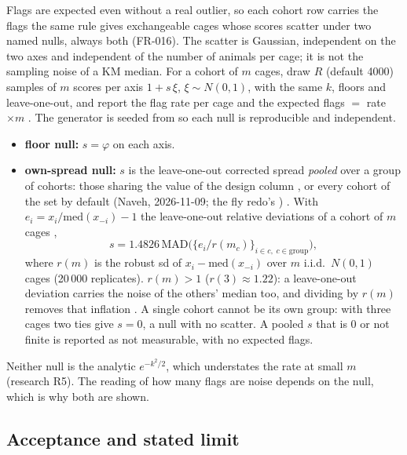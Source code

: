 Flags are expected even without a real outlier, so each cohort row carries the flags the same rule gives exchangeable
cages whose scores scatter under two named nulls, always both (FR-016). The scatter is Gaussian, independent on the two
axes and independent of the number of animals per cage; it is not the sampling noise of a KM median. For a cohort of $m$ cages, draw $R$ (default 4000) samples of $m$
scores per axis $1+s\,\xi$, $\xi\sim N(0,1)$, with the same $k$, floors and leave-one-out, and report the flag rate
per cage and the expected flags $=$ rate$\times m$ . The generator is
 seeded from  so each null is reproducible and independent.
\begin{itemize}[nosep]
  \item \textbf{floor null:} $s=\varphi$ on each axis.
  \item \textbf{own-spread null:} $s$ is the leave-one-out corrected spread \emph{pooled} over a group of cohorts:
    those sharing the value of the design column , or every cohort of the set by default (Naveh,
    2026-11-09; the fly redo's ) . With $e_i=x_i/\mathrm{med}(x_{-i})-1$ the leave-one-out
    relative deviations of a cohort of $m$ cages ,
    \begin{equation}\label{eq:clean-own}
      s=1.4826\,\mathrm{MAD}\big(\{e_i/r(m_c)\}_{i\in c,\;c\in\text{group}}\big),
    \end{equation}
    where $r(m)$ is the robust sd of $x_i-\mathrm{med}(x_{-i})$ over $m$ i.i.d.\ $N(0,1)$ cages (20\,000
    replicates). $r(m)>1$ ($r(3)\approx1.22$): a leave-one-out deviation carries the noise of the others' median too,
    and dividing by $r(m)$ removes that inflation . A single cohort cannot be its own
    group: with three cages two ties give $s=0$, a null with no scatter. A pooled $s$ that is $0$ or not finite is
    reported as not measurable, with no expected flags.
\end{itemize}
Neither null is the analytic $e^{-k^2/2}$, which understates the rate at small $m$ (research R5). The reading of how
many flags are noise depends on the null, which is why both are shown.

\subsection{Acceptance and stated limit}\label{sec:clean-accept}

